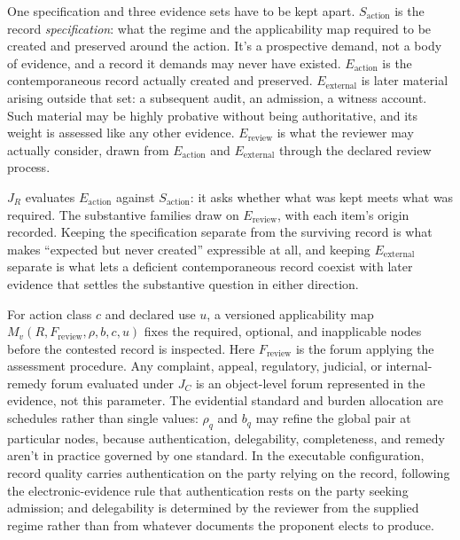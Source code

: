 One specification and three evidence sets have to be kept apart. \(S_{\mathrm{action}}\) is the record \emph{specification}: what the regime and the applicability map required to be created and preserved around the action. It's a prospective demand, not a body of evidence, and a record it demands may never have existed. \(E_{\mathrm{action}}\) is the contemporaneous record actually created and preserved. \(E_{\mathrm{external}}\) is later material arising outside that set: a subsequent audit, an admission, a witness account. Such material may be highly probative without being authoritative, and its weight is assessed like any other evidence. \(E_{\mathrm{review}}\) is what the reviewer may actually consider, drawn from \(E_{\mathrm{action}}\) and \(E_{\mathrm{external}}\) through the declared review process.

\(J_R\) evaluates \(E_{\mathrm{action}}\) against \(S_{\mathrm{action}}\): it asks whether what was kept meets what was required. The substantive families draw on \(E_{\mathrm{review}}\), with each item's origin recorded. Keeping the specification separate from the surviving record is what makes \enquote{expected but never created} expressible at all, and keeping \(E_{\mathrm{external}}\) separate is what lets a deficient contemporaneous record coexist with later evidence that settles the substantive question in either direction.

For action class \(c\) and declared use \(u\), a versioned applicability map \(M_v(R,F_{\mathrm{review}},\rho,b,c,u)\) fixes the required, optional, and inapplicable nodes before the contested record is inspected. Here \(F_{\mathrm{review}}\) is the forum applying the assessment procedure. Any complaint, appeal, regulatory, judicial, or internal-remedy forum evaluated under \(J_C\) is an object-level forum represented in the evidence, not this parameter. The evidential standard and burden allocation are schedules rather than single values: \(\rho_q\) and \(b_q\) may refine the global pair at particular nodes, because authentication, delegability, completeness, and remedy aren't in practice governed by one standard. In the executable configuration, record quality carries authentication on the party relying on the record, following the electronic-evidence rule that authentication rests on the party seeking admission; and delegability is determined by the reviewer from the supplied regime rather than from whatever documents the proponent elects to produce.


